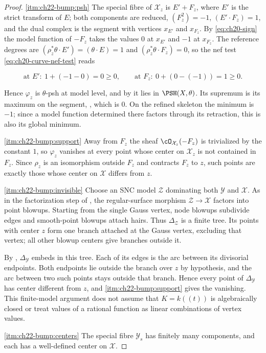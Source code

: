 \begin{proof}
\cref{itm:ch22-bump:psh}  The special fibre of $\mathcal X_z$ is
$E'+F_z$, where $E'$ is the strict transform of $E$; both components
are reduced, $(F_z^2)=-1$, $(E'\cdot F_z)=1$, and the dual complex is
the segment with vertices $x_{E'}$ and $x_{F_z}$.  By
\eqref{eq:ch20-sign} the model function of $-F_z$ takes the values
$0$ at $x_{E'}$ and $-1$ at $x_{F_z}$.  The reference degrees are
$(\rho_z^*\theta\cdot E')=(\theta\cdot E)=1$ and
$(\rho_z^*\theta\cdot F_z)=0$, so the nef test
\eqref{eq:ch20-curve-nef-test} reads

\[
 \text{at }E':\ 1+(-1-0)=0\geq0,
 \qquad
 \text{at }F_z:\ 0+(0-(-1))=1\geq0 .
\]

Hence $\varphi_z$ is $\theta$-psh at model level, and by
 it lies in $\PSH(X,\theta)$.  Its
supremum is its maximum on the segment,
, which is $0$.  On the refined skeleton the minimum is
$-1$; since a
model function determined there factors through its retraction, this is also
its global minimum.

\cref{itm:ch22-bump:support}  Away from $F_z$ the sheaf
$\cO_{\mathcal X_z}(-F_z)$ is trivialized by the constant $1$, so
$\varphi_z$ vanishes at every point whose center on $\mathcal X_z$ is
not contained in $F_z$.  Since $\rho_z$ is an isomorphism outside
$F_z$ and contracts $F_z$ to $z$, such points are exactly those whose
center on $\mathcal X$ differs from $z$.

\cref{itm:ch22-bump:invisible}
Choose an SNC model $\mathcal Z$ dominating both $\mathcal Y$ and
$\mathcal X$.  As in the factorization step of
, the regular-surface morphism
$\mathcal Z\to\mathcal X$ factors into point blowups.  Starting from the
single Gauss vertex, node blowups subdivide edges and smooth-point blowups
attach hairs.  Thus $\Delta_{\mathcal Z}$ is a finite tree.  Its points
with center $z$ form one branch attached at the Gauss vertex, excluding
that vertex; all other blowup centers give branches outside it.

By , $\Delta_{\mathcal Y}$ embeds in this
tree.  Each of its edges is the arc between its divisorial endpoints.
Both endpoints lie outside the branch over $z$ by hypothesis, and the
arc between two such points stays outside that branch.  Hence every point
of $\Delta_{\mathcal Y}$ has center different from $z$, and
\cref{itm:ch22-bump:support} gives the vanishing.  This finite-model
argument does not assume that $K=k((t))$ is algebraically closed or treat
values of a rational function as linear combinations of vertex values.

\cref{itm:ch22-bump:centers}  The special fibre $\mathcal Y_s$ has finitely
many components, and each has a well-defined center on $\mathcal X$.
\end{proof}

